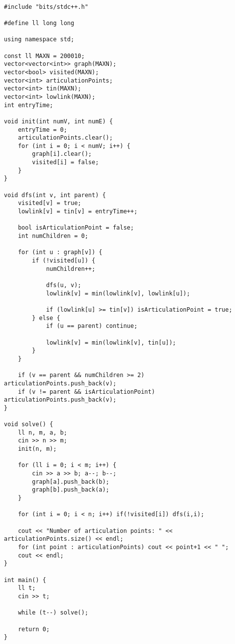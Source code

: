 \documentclass[landscape,twocolumn,10pt,a4paper]{article}
\begin{document}
\begin{verbatim}

#include "bits/stdc++.h"

#define ll long long

using namespace std;

const ll MAXN = 200010;
vector<vector<int>> graph(MAXN);
vector<bool> visited(MAXN);
vector<int> articulationPoints;
vector<int> tin(MAXN);
vector<int> lowlink(MAXN);
int entryTime;

void init(int numV, int numE) {
    entryTime = 0;
    articulationPoints.clear();
    for (int i = 0; i < numV; i++) {
        graph[i].clear();
        visited[i] = false;
    }
}

void dfs(int v, int parent) {
    visited[v] = true;
    lowlink[v] = tin[v] = entryTime++;

    bool isArticulationPoint = false;
    int numChildren = 0;

    for (int u : graph[v]) {
        if (!visited[u]) {
            numChildren++;
            
            dfs(u, v);
            lowlink[v] = min(lowlink[v], lowlink[u]);

            if (lowlink[u] >= tin[v]) isArticulationPoint = true;
        } else {
            if (u == parent) continue;

            lowlink[v] = min(lowlink[v], tin[u]);
        }
    }

    if (v == parent && numChildren >= 2) articulationPoints.push_back(v);
    if (v != parent && isArticulationPoint) articulationPoints.push_back(v);
}

void solve() {
    ll n, m, a, b;
    cin >> n >> m;
    init(n, m);

    for (ll i = 0; i < m; i++) {
        cin >> a >> b; a--; b--;
        graph[a].push_back(b);
        graph[b].push_back(a);
    }

    for (int i = 0; i < n; i++) if(!visited[i]) dfs(i,i);

    cout << "Number of articulation points: " << articulationPoints.size() << endl;
    for (int point : articulationPoints) cout << point+1 << " ";
    cout << endl;
}

int main() {
    ll t;
    cin >> t;

    while (t--) solve();

    return 0;
}\end{verbatim}
\end{document}
